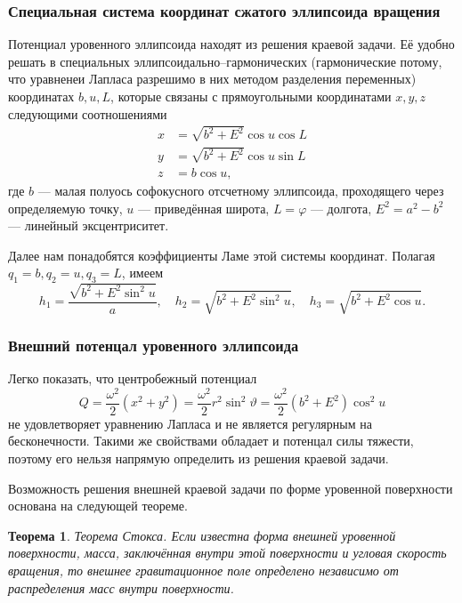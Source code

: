 \documentclass[11pt, a4paper,addpoints]{exam}
\newtheorem*{theorem*}{Теорема}
\theoremstyle{remark}
\renewcommand{\phi}{\ensuremath{\varphi}}
\renewcommand{\theta}{\vartheta}
\begin{document}
\subsubsection*{Специальная система координат сжатого эллипсоида вращения}
Потенциал уровенного эллипсоида находят из решения краевой задачи. Её удобно решать в специальных
эллипсоидально--гармонических (гармонические потому, что уравненеи Лапласа разрешимо в них методом
разделения переменных) координатах $b, u, L$, которые связаны с прямоугольными координатами
$x, y, z$ следующими соотношениями 
\begin{align*}
    x &= \sqrt{b^2 + E^2}\cos{u}\cos{L} \\
    y &= \sqrt{b^2 + E^2}\cos{u}\sin{L} \\
    z &= b\cos{u},
\end{align*}
где $b$ --- малая полуось софокусного отсчетному эллипсоида, проходящего через определяемую точку,
$u$ --- приведённая широта, $L=\phi$ --- долгота, $E^2 = a^2 - b^2$ --- линейный эксцентриситет.\par

Далее нам понадобятся коэффициенты Ламе этой системы координат. Полагая $q_1 = b, q_2 = u, q_3 = L$, имеем
\begin{equation}
    h_1 = \dfrac{\sqrt{b^2 + E^2\sin^2{u}}}{a}, \quad h_2 = \sqrt{b^2 + E^2\sin^2 u},\quad
    h_3 = \sqrt{b^2 + E^2\cos{u}}.
    \label{eq:lame}
\end{equation}

\subsubsection*{Внешний потенцал уровенного эллипсоида}

Легко показать, что центробежный потенциал
\begin{equation}
    Q = \dfrac{\omega^2}{2}\left( x^2 + y^2 \right) = \dfrac{\omega^2}{2}r^2\sin^2\theta = 
    \dfrac{\omega^2}{2}\left( b^2 + E^2 \right)\cos^2{u}
    \label{eq:centrifugal}
\end{equation}
не удовлетворяет уравнению Лапласа и не является регулярным на бесконечности. Такими же свойствами
обладает и потенцал силы тяжести, поэтому его нельзя напрямую определить из решения краевой задачи.

Возможность решения внешней краевой задачи по форме уровенной поверхности основана на следующей
теореме.
\begin{theorem*}{Теорема Стокса.}
    Если известна форма внешней уровенной поверхности, масса, заключённая внутри этой поверхности и
    угловая скорость вращения, то внешнее гравитационное поле определено независимо от распределения
    масс внутри поверхности.
    \label{the:stokes}
\end{theorem*}
\end{document}
